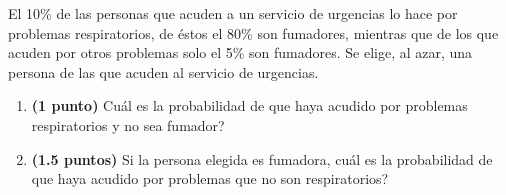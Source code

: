 
El 10\% de las personas que acuden a un servicio de urgencias lo hace por problemas respiratorios, de éstos el 80\% son fumadores, mientras que de los que acuden por otros problemas solo el 5\% son fumadores. Se elige, al azar, una persona de las que acuden al servicio de urgencias.
\begin{enumerate}[label=\alph*)]
\item \textbf{(1 punto)} \textquestiondown{}Cuál es la probabilidad de que haya acudido por problemas respiratorios y no sea fumador?
\item \textbf{(1.5 puntos)} Si la persona elegida es fumadora, \textquestiondown{}cuál es la probabilidad de que haya acudido por problemas que no son respiratorios?
\end{enumerate}

